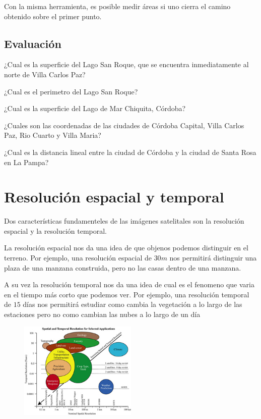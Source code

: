 \documentclass[a4paper,12pt]{book}
\begin{document}
Con la misma herramienta, es posible medir áreas si uno cierra el camino obtenido sobre el primer punto.

\section{Evaluación}

\begin{que}
    ¿Cual es la superficie del Lago San Roque, que se encuentra inmediatamente al norte de Villa Carlos Paz?
\end{que}
\begin{que}
    ¿Cual es el perimetro del Lago San Roque?
\end{que}
\begin{que}
    ¿Cual es la superficie del Lago de Mar Chiquita, Córdoba?
\end{que}

\begin{que}
    ¿Cuales son las coordenadas de las ciudades de Córdoba Capital, Villa Carlos Paz, Rio Cuarto y Villa Maria?
\end{que}

\begin{que}
    ¿Cual es la distancia lineal entre la ciudad de Córdoba y la ciudad de Santa Rosa en La Pampa?
\end{que}

\chapter{Resolución espacial y temporal}
Dos características fundamenteles de las imágenes satelitales son la resolución espacial y la resolución temporal.

La resolución espacial nos da una idea de que objenos podemos distinguir en el terreno. Por ejemplo, una resolución espacial de $30m$ nos permitirá distinguir una plaza de una manzana construida, pero no las casas dentro de una manzana.

A su vez la resolución temporal nos da una idea de cual es el fenomeno que varia en el tiempo más corto que podemos ver. Por ejemplo, una resolución temporal de $15$ días nos permitirá estudiar como cambia la vegetación a lo largo de las estaciones pero no como cambian las nubes a lo largo de un día


\begin{figure}[h!]
    \centering
    \includegraphics[width=0.5\textwidth]{fig:evst.jpg}
    \caption{}
    \label{fig:evst}
\end{figure}
\end{document}
